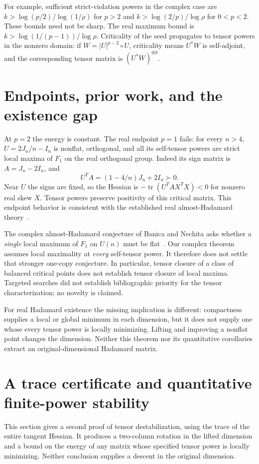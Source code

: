 \documentclass[11pt]{article}
\begin{document}
For example, sufficient strict-violation powers in the complex case
are $k>\log(p/2)/\log(1/\rho)$ for $p>2$ and
$k>\log(2/p)/\log\rho$ for $0<p<2$. These bounds need not be sharp.
The real maximum bound is $k>\log(1/(p-1))/\log\rho$.
Criticality of the seed propagates to tensor powers in the nonzero
domain: if $W=|U|^{p-2}\circ U$, criticality means $U^*W$ is
self-adjoint, and the corresponding tensor matrix is $(U^*W)^{\otimes k}$.

\section{Endpoints, prior work, and the existence gap}
At $p=2$ the energy is constant. The real endpoint $p=1$ fails:
for every $n>4$, $U=2J_n/n-I_n$ is nonflat, orthogonal, and all its
self-tensor powers are strict local maxima of $F_1$ on the real
orthogonal group. Indeed its sign matrix is $A=J_n-2I_n$, and
\[
 U^TA=(1-4/n)J_n+2I_n\succ0.
\]
Near $U$ the signs are fixed, so the Hessian is
$-\operatorname{tr}(U^TA X^TX)<0$ for nonzero real skew $X$.
Tensor powers preserve positivity of this critical matrix.
This endpoint behavior is consistent with the established real
almost-Hadamard theory~\cite{BN,BNZ}.

The complex almost-Hadamard conjecture of Banica and Nechita asks
whether a \emph{single} local maximum of $F_1$ on $U(n)$ must be
flat~\cite{Complex}. Our complex theorem assumes local maximality at
\emph{every} self-tensor power. It therefore does not settle that
stronger one-copy conjecture. In particular, tensor closure of a
class of balanced critical points does not establish tensor closure
of local maxima. Targeted searches did not establish bibliographic
priority for the tensor characterization; no novelty is claimed.

For real Hadamard existence the missing implication is different:
compactness supplies a local or global minimum in each dimension,
but it does not supply one whose every tensor power is locally
minimizing. Lifting and improving a nonflat point changes the
dimension. Neither this theorem nor its quantitative corollaries
extract an original-dimensional Hadamard matrix.
\section{A trace certificate and quantitative finite-power stability}
This section gives a second proof of tensor destabilization, using the
trace of the entire tangent Hessian. It produces a two-column rotation
in the lifted dimension and a bound on the energy of any matrix whose
specified tensor power is locally minimizing. Neither conclusion
supplies a descent in the original dimension.
\end{document}
